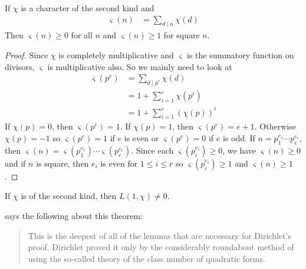 \documentclass[elemannt.tex]{subfile}
\begin{document}
		\begin{proposition}\label{pro:second-char-geq1}
			If $\chi$ is a character of the second kind and
				\begin{align*}
					\varsigma(n)
						& = \sum_{d\mid n}\chi(d)
				\end{align*}
			Then $\varsigma(n)\geq 0$ for all $n$ and $\varsigma(n)\geq 1$ for square $n$.
		\end{proposition}

		\begin{proof}
			Since $\chi$ is completely multiplicative and $\varsigma$ is the summatory function on divisors, $\varsigma$ is multiplicative also. So we mainly need to look at
				\begin{align*}
					\varsigma(p^{e})
						& = \sum_{d\mid p^{e}}\chi(d)\\
						& = 1+\sum_{i=1}^{e}\chi(p^{i})\\
						& = 1+\sum_{i=1}^{e}(\chi(p))^{i}
				\end{align*}
			If $\chi(p)=0$, then $\varsigma(p^{e})=1$. If $\chi(p)=1$, then $\varsigma(p^{e})=e+1$. Otherwise $\chi(p)=-1$ so $\varsigma(p^{e})=1$ if $e$ is even or $\varsigma(p^{e})=0$ if $e$ is odd. If $n=p_{1}^{e_{1}}\cdots p_{r}^{e_{r}}$, then $\varsigma(n)=\varsigma(p_{1}^{e_{1}})\cdots\varsigma(p_{r}^{e_{r}})$. Since each $\varsigma(p_{i}^{e_{i}})\geq0$, we have $\varsigma(n)\geq0$ and if $n$ is square, then $e_{i}$ is even for $1\leq i\leq r$ so $\varsigma(p_{i}^{e_{i}})\geq 1$ and $\varsigma(n)\geq1$.
		\end{proof}

		\begin{proposition}
			If $\chi$ is of the second kind, then $L(1,\chi)\neq0$.
		\end{proposition}
	\textcite[pp. 122, Theorem 152]{landau_1969} says the following about this theorem:
		\begin{quote}
			This is the deepest of all of the lemmas that are necessary for Dirichlet's proof. Dirichlet proved it only by the considerably roundabout method of using the so-called theory of the class number of quadratic forms.
		\end{quote}
\end{document}
